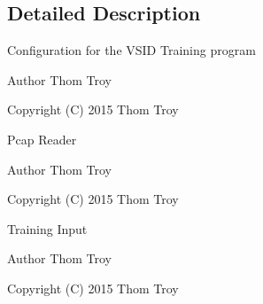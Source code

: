 \subsection{Detailed Description}
Configuration for the V\-S\-I\-D Training program

\begin{DoxyAuthor}{Author}
Thom Troy
\end{DoxyAuthor}
Copyright (C) 2015 Thom Troy

Pcap Reader

\begin{DoxyAuthor}{Author}
Thom Troy
\end{DoxyAuthor}
Copyright (C) 2015 Thom Troy

Training Input

\begin{DoxyAuthor}{Author}
Thom Troy
\end{DoxyAuthor}
Copyright (C) 2015 Thom Troy 

